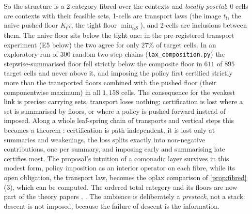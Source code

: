 \documentclass[11pt]{article}
\theoremstyle{definition}
\theoremstyle{remark}
\begin{document}
So the structure is a 2-category fibred over the contexts and \emph{locally posetal}: 0-cells are contexts with their feasible
sets, 1-cells are transport laws (the image $t_!$, the naive pushed floor $K_t\tau$, the tight floor $\min_{t_!S}$), and 2-cells are
inclusions between them. The naive floor sits below the tight one: in the pre-registered transport experiment (E5 below) the two
agree for only $27\%$ of target cells. In an exploratory run of $300$ random two-step chains (\texttt{lax\_composition.py}) the
stepwise-summarised floor fell strictly below the composite floor in $611$ of $895$ target cells and never above it, and imposing
the policy first certified strictly more than the transported floors combined with the pushed floor (their componentwise
maximum) in all $1{,}158$ cells. The consequence for the weakest
link is precise: carrying sets, transport loses nothing; certification is lost where a set is summarised by floors, or where a
policy is pushed forward instead of imposed. Along a whole leaf-spring chain of transports and vertical steps this becomes a
theorem \cite[Thm.~10.26]{Tower}: certification is path-independent, it is lost only at summaries and weakenings, the loss splits
exactly into non-negative contributions, one per summary, and imposing early and summarising late certifies most. The proposal's intuition of a comonadic layer survives in this modest form, policy
imposition as an interior operator on each fibre, while its open obligation, the transport law, becomes the oplax comparison of
\cref{prop:fibred}(3), which can be computed. The ordered total category and its floors are now part of the theory papers
\cite[Def.~3.5, Prop.~3.6]{Conditionals}, \cite[Section~10.7]{Tower}. The ambience is deliberately a \emph{prestack}, not a stack: descent is not imposed,
because the failure of descent is the information.
\end{document}
